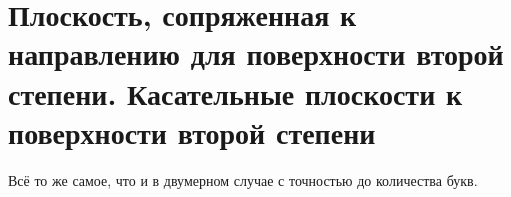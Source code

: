 \section{Плоскость, сопряженная к направлению для поверхности второй степени. Касательные плоскости к поверхности второй степени}

Всё то же самое, что и в двумерном случае с точностью до количества букв.


